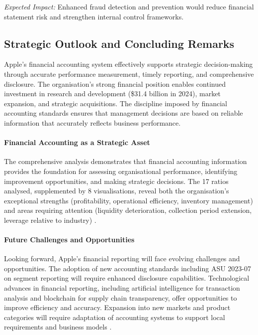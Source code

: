 \documentclass[12pt,a4paper]{article}
\begin{document}
\textit{Expected Impact:} Enhanced fraud detection and prevention would reduce financial statement risk and strengthen internal control frameworks.

\subsection{Strategic Outlook and Concluding Remarks}

Apple's financial accounting system effectively supports strategic decision-making through accurate performance measurement, timely reporting, and comprehensive disclosure. The organisation's strong financial position enables continued investment in research and development (\$31.4 billion in 2024), market expansion, and strategic acquisitions. The discipline imposed by financial accounting standards ensures that management decisions are based on reliable information that accurately reflects business performance.

\paragraph{Financial Accounting as a Strategic Asset}

The comprehensive analysis demonstrates that financial accounting information provides the foundation for assessing organisational performance, identifying improvement opportunities, and making strategic decisions. The 17 ratios analysed, supplemented by 8 visualisations, reveal both the organisation's exceptional strengths (profitability, operational efficiency, inventory management) and areas requiring attention (liquidity deterioration, collection period extension, leverage relative to industry) \citep{apple202410k}.

\paragraph{Future Challenges and Opportunities}

Looking forward, Apple's financial reporting will face evolving challenges and opportunities. The adoption of new accounting standards including ASU 2023-07 on segment reporting will require enhanced disclosure capabilities. Technological advances in financial reporting, including artificial intelligence for transaction analysis and blockchain for supply chain transparency, offer opportunities to improve efficiency and accuracy. Expansion into new markets and product categories will require adaptation of accounting systems to support local requirements and business models \citep{aicpa2020}.
\end{document}
